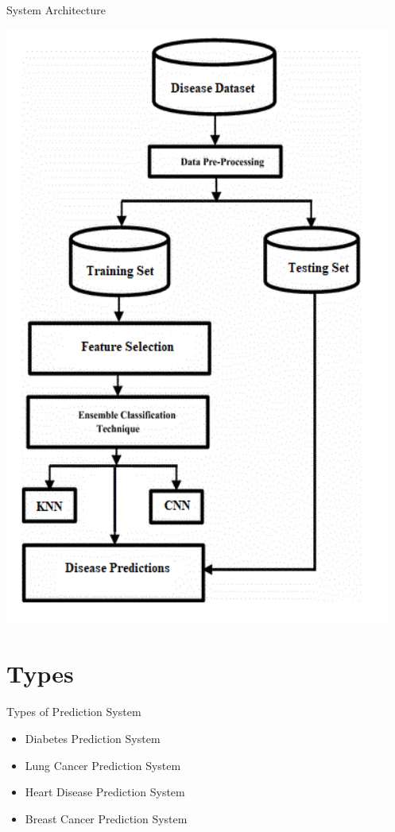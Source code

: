 \documentclass{SKP-beamer}
\begin{document}
\begin{frame}{System Architecture}
	\begin{center}
	\includegraphics[scale=0.48]{1.png}
\end{center}
\end{frame}

\section{\textbf{Types}}

\begin{frame}{Types of Prediction System}
	\begin{itemize}
		\item Diabetes Prediction System
		\item Lung Cancer Prediction System
		\item Heart Disease Prediction System	
		\item Breast Cancer Prediction System		
	\end{itemize}
\end{frame}
\end{document}
